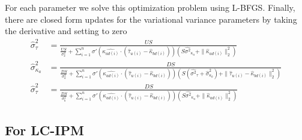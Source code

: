 \documentclass{article}
\begin{document}
For each parameter we solve this optimization problem using L-BFGS. Finally, there are closed form updates for the variational variance parameters by taking the derivative and setting to zero
\begin{align*}
\hat{\sigma}^2_\tau & = \frac{US}{\frac{US}{\sigma^2_x} + \sum_{i=1}^n \sigma'(\hat{\kappa_{ad(i)}} \cdot (\hat{\tau}_{u(i)} - \hat{\kappa}_{bd(i)}))(S\hat{\sigma^2}_{\kappa_a} + \|\hat{\kappa}_{ad(i)}\|_2^2)}\\
\hat{\sigma}^2_{\kappa_a} & = \frac{DS}{\frac{DS}{\sigma^2_a} + \sum_{i=1}^n \sigma'(\hat{\kappa_{ad(i)}} \cdot (\hat{\tau}_{u(i)} - \hat{\kappa}_{bd(i)}))(S(\hat{\sigma^2}_{\tau} + \hat{\sigma}^2_{\kappa_b}) + \|\hat{\tau}_{u(i)} - \hat{\kappa}_{bd(i)}\|_2^2)}\\
\hat{\sigma}^2_\tau & = \frac{DS}{\frac{DS}{\sigma^2_b} + \sum_{i=1}^n \sigma'(\hat{\kappa_{ad(i)}} \cdot (\hat{\tau}_{u(i)} - \hat{\kappa}_{bd(i)}))(S\hat{\sigma^2}_{\kappa_a} + \|\hat{\kappa}_{ad(i)}\|_2^2)}
\end{align*}







\newpage


\subsection{For LC-IPM}
\end{document}
